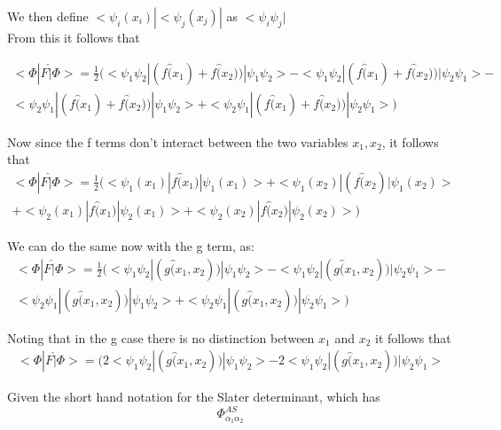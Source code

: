\documentclass[11pt]{article} %
\begin{document}
We then define $<\psi_i(x_i)|<\psi_j(x_j)|$ as $<\psi_i \psi_j|$\\ 


From this it follows that

\begin{equation}
\begin{split}
<\Phi|F\hat|\Phi>=\frac{1}{2}(<\psi_1 \psi_2|(f\hat(x_1)+f\hat(x_2))|\psi_1\psi_2>-<\psi_1\psi_2|(f\hat(x_1)+f\hat(x_2))|\psi_2\psi_1>-\\ <\psi_2 \psi_1|(f\hat(x_1)+f\hat(x_2))|\psi_1\psi_2>+<\psi_2\psi_1|(f\hat(x_1)+f\hat(x_2))|\psi_2\psi_1>)
\end{split}
\end{equation}

Now since the f terms don't interact between the two variables $x_1, x_2$, it follows that\\
\begin{equation}
\begin{split}
<\Phi|F\hat|\Phi>=\frac{1}{2}(<\psi_1(x_1)|f\hat(x_1)|\psi_1(x_1)>+<\psi_1(x_2)|(f\hat(x_2)|\psi_1(x_2)>\\+<\psi_2(x_1)|f\hat(x_1)|\psi_2(x_1)>+<\psi_2(x_2)|f\hat(x_2)|\psi_2(x_2)>)
\end{split}
\end{equation}

We can do the same now with the g term, as:\\
\begin{equation}
\begin{split}
<\Phi|F\hat|\Phi>=\frac{1}{2}(<\psi_1 \psi_2|(g\hat(x_1,x_2))|\psi_1\psi_2>-<\psi_1\psi_2|(g\hat(x_1,x_2))|\psi_2\psi_1>-\\ <\psi_2 \psi_1|(g\hat(x_1,x_2))|\psi_1\psi_2>+<\psi_2\psi_1|(g\hat(x_1,x_2))|\psi_2\psi_1>)
\end{split}
\end{equation}

Noting that in the g case there is no distinction between $x_1$ and $x_2$ it follows that\\

\begin{equation}
\begin{split}
<\Phi|F\hat|\Phi>=(2<\psi_1 \psi_2|(g\hat(x_1,x_2))|\psi_1\psi_2>-2<\psi_1\psi_2|(g\hat(x_1,x_2))|\psi_2\psi_1>
\end{split}
\end{equation}

Given the short hand notation for the Slater determinant, which has\\

\begin{equation}
\Phi_{\alpha_1 \alpha_2}^{AS}
\end{equation}
\end{document}
